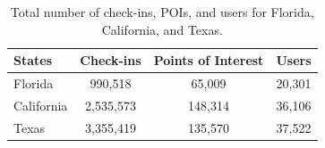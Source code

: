 \begin{table}[htbp]
\centering
\caption{Total number of check-ins, POIs, and users for Florida, California, and Texas.}
\label{tab:courb:dataset}
\begin{tabular}{lccc}
\toprule
States & Check-ins & Points of Interest & Users \\
\midrule
Florida & 990,518 & 65,009 & 20,301 \\
California & 2,535,573 & 148,314 & 36,106 \\
Texas & 3,355,419 & 135,570 & 37,522 \\
\bottomrule
\end{tabular}
\end{table}
